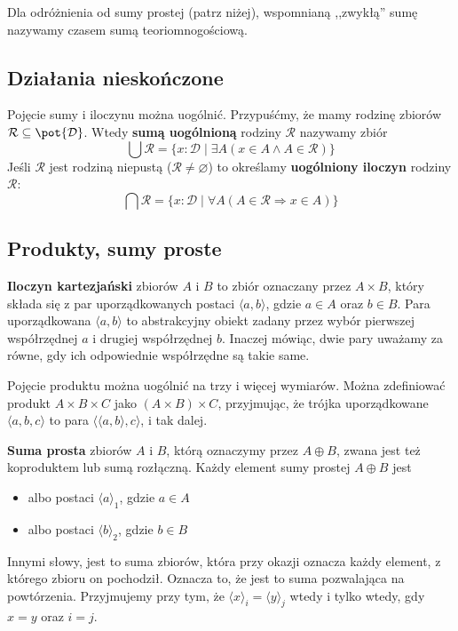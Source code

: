 Dla odróżnienia od sumy prostej (patrz niżej), wspomnianą ,,zwykłą'' sumę nazywamy czasem sumą teoriomnogościową.

\subsection{Działania nieskończone}
Pojęcie sumy i iloczynu można uogólnić. Przypuśćmy, że mamy rodzinę zbiorów $\mathcal{R} \subseteq \pot{\mathcal{D}}$.
Wtedy \textbf{sumą uogólnioną} rodziny $\mathcal{R}$ nazywamy zbiór
$$\bigcup \mathcal{R} = \{x : \mathcal{D} \; | \; \exists A (x \in A \land A \in \mathcal{R}) \}$$
Jeśli $\mathcal{R}$ jest rodziną niepustą ($\mathcal{R} \neq \varnothing$) to określamy \textbf{uogólniony iloczyn} rodziny $\mathcal{R}$:
$$\bigcap \mathcal{R} = \{ x : \mathcal{D} \; | \; \forall A ( A \in \mathcal{R} \Rightarrow x \in A) \}$$

\subsection{Produkty, sumy proste}
\textbf{Iloczyn kartezjański} zbiorów $A$ i $B$ to zbiór oznaczany przez
$A \times B$, który składa się z par uporządkowanych postaci $\langle a, b \rangle$, gdzie $a \in A$ oraz $b \in B$. 
Para uporządkowana $\langle a, b \rangle$ to abstrakcyjny obiekt zadany przez wybór pierwszej współrzędnej $a$ i drugiej współrzędnej $b$. Inaczej mówiąc, dwie pary uważamy za równe, gdy ich odpowiednie współrzędne są takie same.

Pojęcie produktu można uogólnić na trzy i więcej wymiarów. Można zdefiniować produkt $A \times B \times C$ jako $(A \times B) \times C$, przyjmując, że trójka uporządkowane $\langle a, b, c \rangle$ to 
para $\langle \langle a, b \rangle, c \rangle$, i tak dalej.

\textbf{Suma prosta} zbiorów $A$ i $B$, którą oznaczymy przez $A \oplus B$, zwana jest też koproduktem lub sumą rozłączną. Każdy element sumy prostej $A \oplus B$ jest
\begin{itemize}
    \item albo postaci $\langle a \rangle_1$, gdzie $a \in A$
    \item albo postaci $\langle b \rangle_2$, gdzie $b \in B$
\end{itemize}
Innymi słowy, jest to suma zbiorów, która przy okazji oznacza każdy element, z którego zbioru on pochodził. Oznacza to, że jest to suma pozwalająca na powtórzenia. Przyjmujemy przy tym, że $\langle x \rangle_i = \langle y \rangle_j$
wtedy i tylko wtedy, gdy $x = y$ oraz $i = j$.

